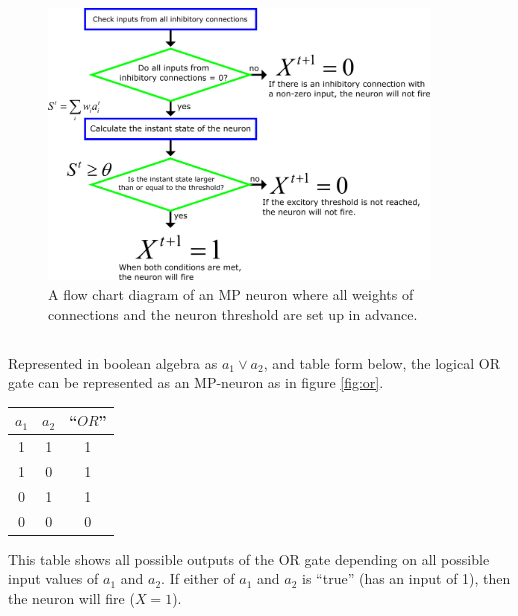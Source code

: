 \documentclass[a4paper]{report}
\begin{document}
\begin{figure}[H]
    \centering
    \includegraphics[width=0.9\textwidth]{images/mpFlow.png}
    \caption{A flow chart diagram of an MP neuron where all weights of connections and the neuron threshold are set up in advance.}
    \label{fig:MPflow}
\end{figure}

\subsection{}

Represented in boolean algebra as \(a_1 \vee a_2\), and table form below, the logical OR gate can be represented as an MP-neuron as in figure \ref{fig:or}.

\begin{tabular}{| c | c | c |}
    \hline
    \(a_1\) & \(a_2\) & ``\(OR\)'' \\ [0.5ex]
    \hline\hline
    1       & 1       & 1          \\
    \hline
    1       & 0       & 1          \\
    \hline
    0       & 1       & 1          \\
    \hline
    0       & 0       & 0          \\ [1ex]
    \hline
\end{tabular}
\linebreak
\linebreak

This table shows all possible outputs of the OR gate depending on all possible input values of \(a_1\) and \(a_2\). If either of \(a_1\) and \(a_2\) is ``true'' (has an input of 1), then the neuron will fire (\(X = 1\)).
\end{document}
